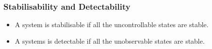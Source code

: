 \documentclass[12pt,a4paper]{article}
\begin{document}
\subsubsection{Stabilisability and Detectability}
\begin{itemize}
\item A system is stabilisable if all the uncontrollable states are stable.
\item A systems is detectable if all the unobservable states are stable.
\end{itemize}
\end{document}
